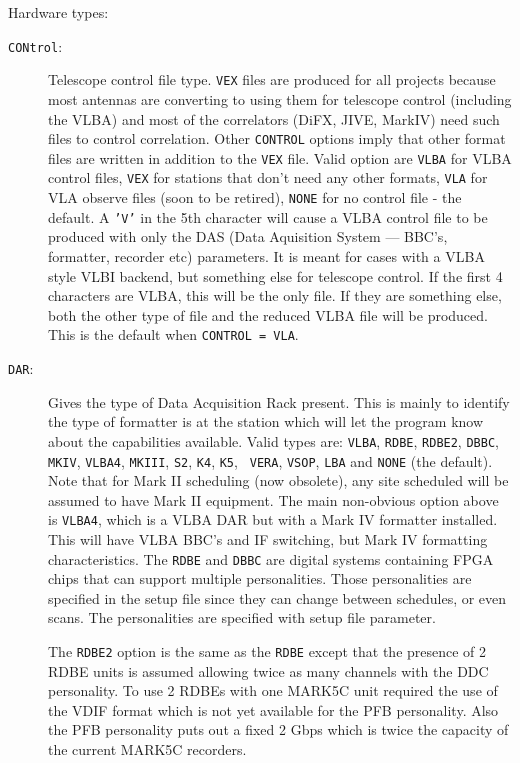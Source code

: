 \documentclass{report}
\begin{document}
Hardware types:

\begin{description}

\item [{\tt CONtrol}:] Telescope control file type. {\tt VEX} files
are produced for all projects because most antennas are converting
to using them for telescope control (including the VLBA) and most
of the correlators (DiFX, JIVE, MarkIV) need such files to control
correlation.  Other {\tt CONTROL} options imply that other format
files are written in addition to the {\tt VEX} file.  Valid option are
{\tt VLBA} for VLBA control files,
{\tt VEX} for stations that don't need any other formats,
{\tt VLA} for VLA observe files (soon to be retired),
{\tt NONE} for no control file - the default.
A {\tt 'V'} in the 5th character will cause a VLBA
control file to be produced with only the DAS (Data Aquisition System
--- BBC's, formatter, recorder etc) parameters.  It is meant for
cases with a VLBA style VLBI backend, but something else for telescope
control.  If the first
4 characters are VLBA, this will be the only file.  If they are
something else, both the other type of file and the reduced VLBA file
will be produced.  This is the default when {\tt CONTROL = VLA}.

\item [{\tt DAR}:] Gives the type of Data Acquisition Rack present.
This is mainly to identify the type of formatter is at the station
which will let the program know about the capabilities available.
Valid types are: {\tt VLBA}, {\tt RDBE}, {\tt RDBE2}, {\tt DBBC}, {\tt
MKIV}, {\tt VLBA4}, {\tt MKIII}, {\tt S2}, {\tt K4}, {\tt K5}, {\tt
VERA}, {\tt VSOP}, {\tt LBA} and {\tt NONE} (the default).  Note that
for Mark II scheduling (now obsolete), any site scheduled will be
assumed to have Mark II equipment.  The main non-obvious option above
is {\tt VLBA4}, which is a VLBA DAR but with a Mark IV formatter
installed. This will have VLBA BBC's and IF switching, but Mark IV
formatting characteristics.  The {\tt RDBE} and {\tt DBBC} are digital
systems containing FPGA chips that can support multiple personalities.
Those personalities are specified in the setup file since they can
change between schedules, or even scans.  The personalities are
specified with  setup file parameter.

The {\tt RDBE2} option is the same as the {\tt RDBE} except that
the presence of 2 RDBE units is assumed allowing twice as many 
channels with the DDC personality.  To use 2 RDBEs with one MARK5C
unit required the use of the VDIF format which is not yet available
for the PFB personality.  Also the PFB personality puts out a fixed
2 Gbps which is twice the capacity of the current MARK5C recorders.


\end{description}
\end{document}

